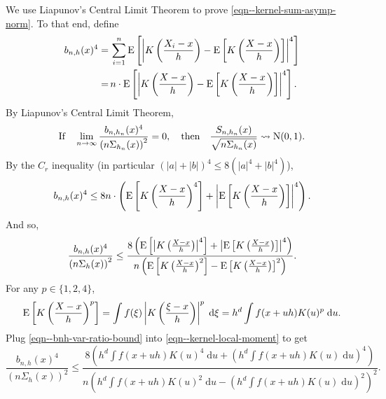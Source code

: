 We use Liapunov's Central Limit Theorem to prove
\eqref{eqn--kernel-sum-asymp-norm}.
To that end, define
\begin{align*}
  b_{n, h} (x)^{4} =
  & \, \sum_{i = 1}^{n} \mathrm{E} \left[ \left| K \left( \frac{X_{i} - x}{h} \right) -
  \mathrm{E} \left[ K \left( \frac{X - x}{h} \right) \right] \right|^{4} \right] \\
  =
  & \, n \cdot \mathrm{E} \left[ \left| K \left( \frac{X - x}{h} \right) - \mathrm{E} \left[ K
  \left( \frac{X - x}{h} \right) \right] \right|^{4} \right].
\end{align*}
By Liapunov's Central Limit Theorem,
\begin{equation}
  \text{If} \quad \lim_{n \to \infty} \frac{b_{n, h_{n}} (x)^{4}}{\left( n
  \Sigma_{h_{n}} (x) \right)^{2}} = 0, \quad \text{then} \quad \frac{S_{n,
  h_{n}} (x)}{\sqrt{n \Sigma_{h_{n}} (x)}} \rightsquigarrow \mathrm{N} (0, 1).
  \label{eqn--liapunov-clt}
\end{equation}
By the \(C_{r}\) inequality (in particular \((|a| + |b|)^{4} \leq 8 \left(
|a|^{4} + |b|^{4} \right)\)),
\begin{equation*}
  b_{n, h} (x)^{4} \leq 8 n \cdot \left( \mathrm{E} \left[ K \left( \frac{X -
  x}{h} \right)^{4} \right] + \left| \mathrm{E} \left[ K \left( \frac{X - x}{h}
  \right) \right] \right|^{4} \right).
\end{equation*}
And so,
\begin{equation}
  \frac{b_{n, h} (x)^{4}}{\left( n \Sigma_{h} (x) \right)^{2}} \leq \frac{8
  \left( \mathrm{E} \left[ \left| K \left( \frac{X - x}{h} \right) \right|^{4} \right] +
  \left| \mathrm{E} \left[ K \left( \frac{X - x}{h} \right) \right] \right|^{4}
  \right)}{n \left( \mathrm{E} \left[ K \left( \frac{X - x}{h} \right)^{2} \right] - \mathrm{E}
  \left[ K \left( \frac{X - x}{h} \right) \right]^{2} \right)}.
  \label{eqn--bnh-var-ratio-bound}
\end{equation}
For any \(p \in \{1, 2, 4\}\),
\begin{equation}
  \mathrm{E} \left[ K \left( \frac{X - x}{h} \right)^{p} \right] = \int f (\xi) \left| K
  \left( \frac{\xi - x}{h} \right) \right|^{p} \; \mathrm{d} \xi = h^{d} \int f
  (x + u h) K (u)^{p} \; \mathrm{d} u.
  \label{eqn--kernel-local-moment}
\end{equation}
Plug \eqref{eqn--bnh-var-ratio-bound} into \eqref{eqn--kernel-local-moment} to
get
\begin{equation*}
  \frac{b_{n, h} (x)^{4}}{\left( n \Sigma_{h} (x) \right)^{2}} \leq \frac{8
  \left( h^{d} \int f (x + u h) K (u)^{4} \; \mathrm{d} u + \left( h^{d} \int f
  (x + u h) K (u) \; \mathrm{d} u \right)^{4} \right)}{n \left( h^{d} \int f (x
  + u h) K (u)^{2} \; \mathrm{d} u - \left( h^{d} \int f (x + u h) K (u) \;
  \mathrm{d} u \right)^{2} \right)^{2}}.
\end{equation*}
